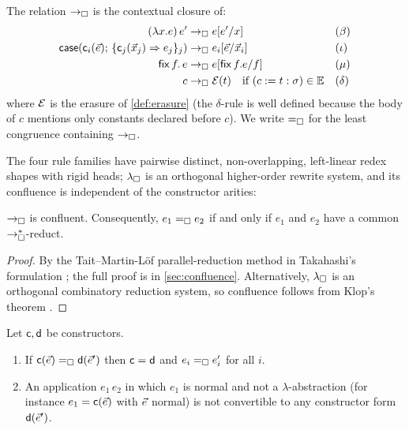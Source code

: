 \begin{definition}
\label{def:lbox-red}
The relation $\rightarrow_{\square}$ is the contextual closure of:
\begin{align*}
  (\lambda x.e)\,e' &\rightarrow_{\square} e[e'/x]
  &&(\beta)\\
  \mathsf{case}(\mathsf{c}_i(\vec{e});\, \{\mathsf{c}_j(\vec{x}_j) \Rightarrow
    e_j\}_j) &\rightarrow_{\square} e_i[\vec{e}/\vec{x}_i]
  &&(\iota)\\
  \mathsf{fix}\,f.\,e &\rightarrow_{\square} e[\mathsf{fix}\,f.e/f]
  &&(\mu)\\
  c &\rightarrow_{\square} \mathcal{E}(t) \quad \text{if } (c \mathrel{:=} t : \sigma) \in \mathbb{E}
  &&(\delta)
\end{align*}
where $\mathcal{E}$ is the erasure of \cref{def:erasure} (the $\delta$-rule
is well defined because the body of $c$ mentions only constants declared
before $c$).  We write $=_{\square}$ for the least congruence containing
$\rightarrow_{\square}$.
\end{definition}

The four rule families have pairwise distinct, non-overlapping,
left-linear redex shapes with rigid heads; $\lambda_{\square}$ is an orthogonal
higher-order rewrite system, and its confluence is independent of the
constructor arities:

\begin{theorem}
\label{thm:confluence}
$\rightarrow_{\square}$ is confluent.  Consequently, $e_1 =_{\square} e_2$ if and only if
$e_1$ and $e_2$ have a common $\rightarrow_{\square}^{*}$-reduct.
\end{theorem}

\begin{proof}
By the Tait--Martin-L{\"o}f parallel-reduction method in Takahashi's
formulation \cite{Takahashi1995}; the full proof is in
\cref{sec:confluence}.  Alternatively, $\lambda_{\square}$ is an orthogonal
combinatory reduction system, so confluence follows from Klop's theorem
\cite{Klop1980}.
\end{proof}

\begin{corollary}
\label{cor:discrimination}
Let $\mathsf{c}, \mathsf{d}$ be constructors.
\begin{enumerate}[leftmargin=2em]
\item If $\mathsf{c}(\vec{e}) =_{\square} \mathsf{d}(\vec{e}')$ then $\mathsf{c} =
  \mathsf{d}$ and $e_i =_{\square} e'_i$ for all $i$.
\item An application $e_1\,e_2$ in which $e_1$ is normal and not a
  $\lambda$-abstraction (for instance $e_1 = \mathsf{c}(\vec{e})$ with
  $\vec{e}$ normal) is not convertible to any constructor form
  $\mathsf{d}(\vec{e}')$.
\end{enumerate}
\end{corollary}

